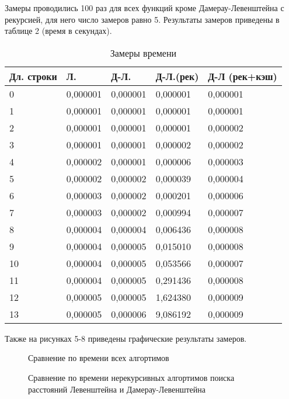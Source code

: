 Замеры проводились 100 раз для всех функций кроме Дамерау-Левенштейна с рекурсией, для него число замеров равно 5.
Результаты замеров приведены в таблице 2 (время в секундах).
\pagebreak
\begin{table}[!h]
    \caption{Замеры времени}
    \centering
    \begin{tabular}{|l|l|l|l|l|}
    \hline
        Дл. строки & Л. & Д-Л. & Д-Л.(рек) & Д-Л (рек+кэш) \\ \hline
        0 & 0,000001 & 0,000001 & 0,000001 & 0,000001 \\ \hline
        1 & 0,000001 & 0,000001 & 0,000001 & 0,000001 \\ \hline
        2 & 0,000001 & 0,000001 & 0,000001 & 0,000002 \\ \hline
        3 & 0,000001 & 0,000001 & 0,000002 & 0,000002 \\ \hline
        4 & 0,000002 & 0,000001 & 0,000006 & 0,000003 \\ \hline
        5 & 0,000002 & 0,000002 & 0,000039 & 0,000004 \\ \hline
        6 & 0,000003 & 0,000002 & 0,000201 & 0,000006 \\ \hline
        7 & 0,000003 & 0,000002 & 0,000994 & 0,000007 \\ \hline
        8 & 0,000004 & 0,000004 & 0,006436 & 0,000008 \\ \hline
        9 & 0,000004 & 0,000005 & 0,015010 & 0,000008 \\ \hline
        10 & 0,000004 & 0,000005 & 0,053566 & 0,000007 \\ \hline
        11 & 0,000004 & 0,000005 & 0,291436 & 0,000008 \\ \hline
        12 & 0,000005 & 0,000005 & 1,624380 & 0,000009 \\ \hline
        13 & 0,000005 & 0,000006 & 9,086192 & 0,000009 \\ \hline
    \end{tabular}
\end{table}

Также на рисунках 5-8 приведены графические результаты замеров.

\begin{figure}[!h]
	\centering
    \def\svgscale{0.45}
	
	\caption{Сравнение по времени всех алгортимов}
	\label{fig:r1}
\end{figure}

\begin{figure}[!h]
	\centering
    \def\svgscale{0.6}
	
	\caption{Сравнение по времени нерекурсивных алгортимов поиска расстояний Левенштейна и Дамерау-Левенштейна}
	\label{fig:r2}
\end{figure}

